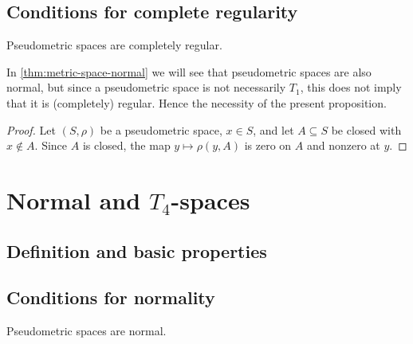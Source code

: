 \documentclass[article, a4paper, 11pt, oneside]{memoir}
\numberwithin{equation}{chapter}
\begin{document}
\section{Conditions for complete regularity}

\begin{proposition}
    \label{thm:pseudometric-completely-regular}
    Pseudometric spaces are completely regular.
\end{proposition}
%
In \cref{thm:metric-space-normal} we will see that pseudometric spaces are also normal, but since a pseudometric space is not necessarily $T_1$, this does not imply that it is (completely) regular. Hence the necessity of the present proposition.

\begin{proof}
    Let $(S,\rho)$ be a pseudometric space, $x \in S$, and let $A \subseteq S$ be closed with $x \not\in A$. Since $A$ is closed, the map $y \mapsto \rho(y,A)$ is zero on $A$ and nonzero at $y$.
\end{proof}





\chapter[Normal and T4-spaces]{Normal and $T_4$-spaces}

\section{Definition and basic properties}

\section{Conditions for normality}

\begin{proposition}
    \label{thm:metric-space-normal}
    Pseudometric spaces are normal.
\end{proposition}
\end{document}
